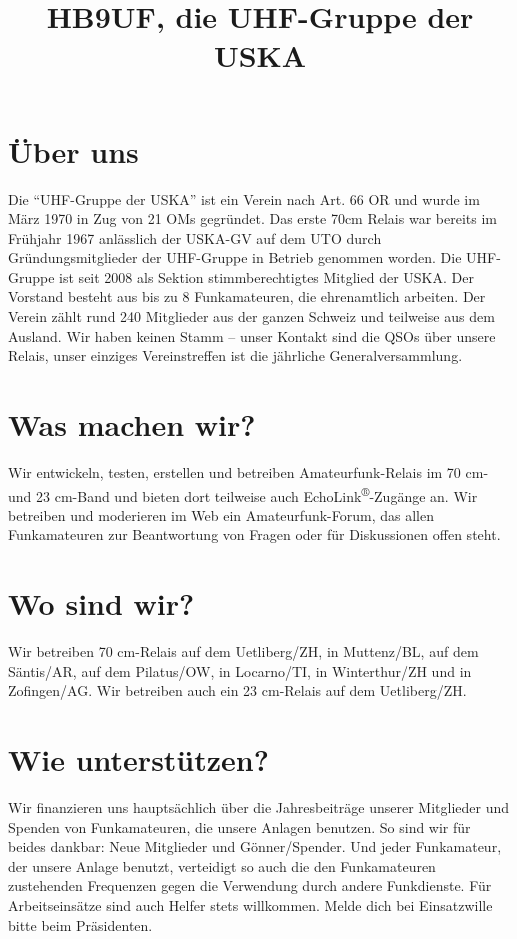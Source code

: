 \documentclass[a4paper,12pt,smallheadings]{scrartcl}
\title{HB9UF, die UHF-Gruppe der USKA}
\author{}
\date{}
\begin{document}
\maketitle
\vspace{-3cm}

\section*{Über uns}
Die ``UHF-Gruppe der USKA'' ist ein Verein nach Art. 66 OR und wurde im März 1970 in
Zug von 21 OMs gegründet. Das erste 70cm Relais war bereits im Frühjahr 1967
anlässlich der USKA-GV auf dem UTO durch Gründungsmitglieder der UHF-Gruppe in
Betrieb genommen worden. Die UHF-Gruppe ist seit 2008 als Sektion
stimmberechtigtes Mitglied der USKA. Der Vorstand besteht aus bis zu 8
Funkamateuren, die ehrenamtlich arbeiten. Der Verein zählt rund 240 Mitglieder
aus der ganzen Schweiz und teilweise aus dem Ausland. Wir haben keinen Stamm –
unser Kontakt sind die QSOs über unsere Relais, unser einziges Vereinstreffen
ist die jährliche Generalversammlung.

\section*{Was machen wir?}
Wir entwickeln, testen, erstellen und betreiben Amateurfunk-Relais im 70 cm-
und 23 cm-Band und bieten dort teilweise auch EchoLink\textsuperscript{®}-Zugänge an. Wir
betreiben und moderieren im Web ein Amateurfunk-Forum, das allen Funkamateuren
zur Beantwortung von Fragen oder für Diskussionen offen steht.

\section*{Wo sind wir?}
Wir betreiben 70 cm-Relais auf dem Uetliberg/ZH, in Muttenz/BL, auf dem
Säntis/AR, auf dem Pilatus/OW, in Locarno/TI, in Winterthur/ZH und in
Zofingen/AG. Wir betreiben auch ein 23 cm-Relais auf dem Uetliberg/ZH.


\section*{Wie unterstützen?}
Wir finanzieren uns hauptsächlich über die Jahresbeiträge unserer Mitglieder
und Spenden von Funkamateuren, die unsere Anlagen benutzen. So sind wir für
beides dankbar: Neue Mitglieder und Gönner/Spender. Und jeder Funkamateur, der
unsere Anlage benutzt, verteidigt so auch die den Funkamateuren zustehenden
Frequenzen gegen die Verwendung durch andere Funkdienste. Für Arbeitseinsätze
sind auch Helfer stets willkommen. Melde dich bei Einsatzwille bitte beim
Präsidenten.
\end{document}
